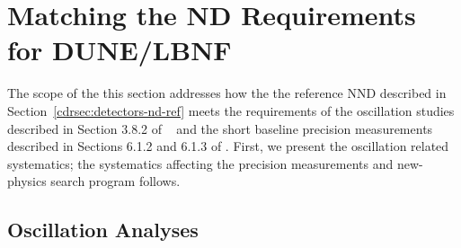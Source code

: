 
\section{Matching the ND Requirements for DUNE/LBNF} 
\label{cdrsec:detectors-nd-ref-fgt-req}

The scope of the this section addresses how the the reference NND
described in Section~\ref{cdrsec:detectors-nd-ref} meets the
requirements of the oscillation studies described in
Section 3.8.2 of \volphys\ %
and the short baseline precision measurements described in Sections 6.1.2
and 6.1.3 of \volphys. %
First,
we present the oscillation related systematics; the systematics
affecting the precision measurements and new-physics search program
follows.


\subsection{Oscillation Analyses} 
\label{cdrsec:detectors-nd-ref-fgt-req-oscl}

